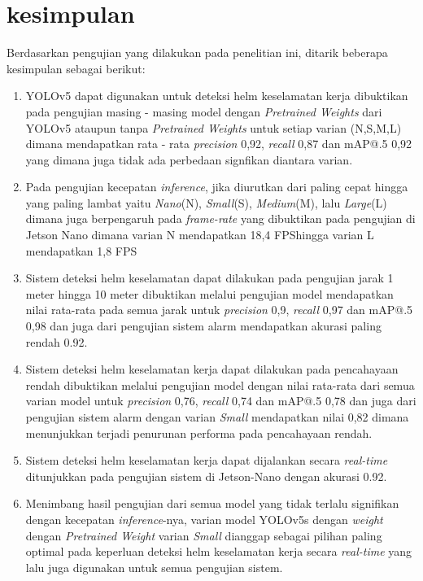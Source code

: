 \section{kesimpulan}
\label{sec:kesimpulan}

\par Berdasarkan pengujian yang dilakukan pada penelitian ini, ditarik beberapa kesimpulan sebagai berikut:

\begin{enumerate}[nolistsep]

    \item YOLOv5 dapat digunakan untuk deteksi helm keselamatan kerja dibuktikan pada pengujian masing - masing model dengan \emph{Pretrained Weights} dari YOLOv5 ataupun tanpa \emph{Pretrained Weights} untuk setiap varian (N,S,M,L) dimana mendapatkan rata - rata \emph{precision} 0,92, \emph{recall}  0,87 dan mAP@.5 0,92 yang dimana juga tidak ada perbedaan signfikan diantara varian.

    \item Pada pengujian kecepatan \emph{inference}, jika diurutkan dari paling cepat hingga yang paling lambat yaitu \emph{Nano}(N), \emph{Small}(S), \emph{Medium}(M), lalu \emph{Large}(L) dimana juga berpengaruh pada \emph{frame-rate} yang dibuktikan pada pengujian di Jetson Nano dimana varian N mendapatkan 18,4 FPShingga varian L mendapatkan 1,8 FPS

    \item Sistem deteksi helm keselamatan dapat dilakukan pada pengujian jarak 1 meter hingga 10 meter dibuktikan melalui pengujian model mendapatkan nilai rata-rata pada semua jarak untuk \emph{precision} 0,9, \emph{recall} 0,97 dan mAP@.5 0,98  dan juga dari pengujian sistem alarm mendapatkan akurasi paling rendah 0.92.

    \item Sistem deteksi helm keselamatan kerja dapat dilakukan pada pencahayaan rendah dibuktikan melalui pengujian model dengan nilai rata-rata dari semua varian model untuk \emph{precision} 0,76, \emph{recall} 0,74 dan mAP@.5 0,78 dan juga dari pengujian sistem alarm dengan varian \emph{Small} mendapatkan nilai 0,82 dimana menunjukkan terjadi penurunan performa pada pencahayaan rendah.

    \item Sistem deteksi helm keselamatan kerja dapat dijalankan secara \emph{real-time} ditunjukkan pada pengujian sistem di Jetson-Nano dengan akurasi 0.92.

    \item Menimbang hasil pengujian dari semua model yang tidak terlalu signifikan dengan kecepatan \emph{inference}-nya, varian model YOLOv5s dengan \emph{weight} dengan \emph{Pretrained Weight} varian \emph{Small} dianggap sebagai pilihan paling optimal pada keperluan deteksi helm keselamatan kerja secara \emph{real-time} yang lalu juga digunakan untuk semua pengujian sistem.
    
\end{enumerate}

